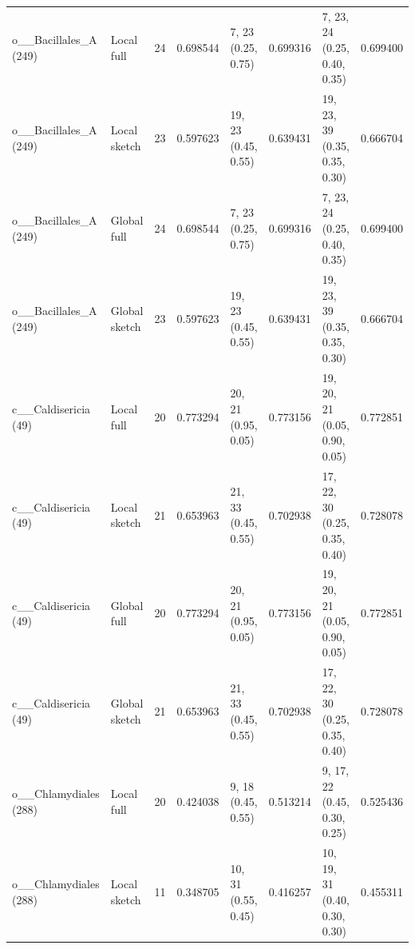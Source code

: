 \begin{longtable}{lllr lrlr}
o\_\_Bacillales\_A (249) & Local full & 24 & 0.698544 & \shortstack[l]{7, 23\\(0.25, 0.75)} & 0.699316 & \shortstack[l]{7, 23, 24\\(0.25, 0.40, 0.35)} & 0.699400 \\
o\_\_Bacillales\_A (249) & Local sketch & 23 & 0.597623 & \shortstack[l]{19, 23\\(0.45, 0.55)} & 0.639431 & \shortstack[l]{19, 23, 39\\(0.35, 0.35, 0.30)} & 0.666704 \\
o\_\_Bacillales\_A (249) & Global full & 24 & 0.698544 & \shortstack[l]{7, 23\\(0.25, 0.75)} & 0.699316 & \shortstack[l]{7, 23, 24\\(0.25, 0.40, 0.35)} & 0.699400 \\
o\_\_Bacillales\_A (249) & Global sketch & 23 & 0.597623 & \shortstack[l]{19, 23\\(0.45, 0.55)} & 0.639431 & \shortstack[l]{19, 23, 39\\(0.35, 0.35, 0.30)} & 0.666704 \\
c\_\_Caldisericia (49) & Local full & 20 & 0.773294 & \shortstack[l]{20, 21\\(0.95, 0.05)} & 0.773156 & \shortstack[l]{19, 20, 21\\(0.05, 0.90, 0.05)} & 0.772851 \\
c\_\_Caldisericia (49) & Local sketch & 21 & 0.653963 & \shortstack[l]{21, 33\\(0.45, 0.55)} & 0.702938 & \shortstack[l]{17, 22, 30\\(0.25, 0.35, 0.40)} & 0.728078 \\
c\_\_Caldisericia (49) & Global full & 20 & 0.773294 & \shortstack[l]{20, 21\\(0.95, 0.05)} & 0.773156 & \shortstack[l]{19, 20, 21\\(0.05, 0.90, 0.05)} & 0.772851 \\
c\_\_Caldisericia (49) & Global sketch & 21 & 0.653963 & \shortstack[l]{21, 33\\(0.45, 0.55)} & 0.702938 & \shortstack[l]{17, 22, 30\\(0.25, 0.35, 0.40)} & 0.728078 \\
o\_\_Chlamydiales (288) & Local full & 20 & 0.424038 & \shortstack[l]{9, 18\\(0.45, 0.55)} & 0.513214 & \shortstack[l]{9, 17, 22\\(0.45, 0.30, 0.25)} & 0.525436 \\
o\_\_Chlamydiales (288) & Local sketch & 11 & 0.348705 & \shortstack[l]{10, 31\\(0.55, 0.45)} & 0.416257 & \shortstack[l]{10, 19, 31\\(0.40, 0.30, 0.30)} & 0.455311 \\

\end{longtable}
